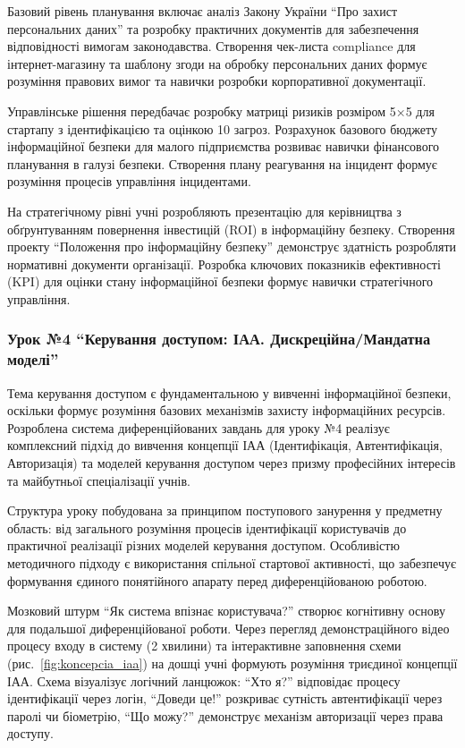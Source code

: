 Базовий рівень планування включає аналіз Закону України ``Про захист персональних даних'' та розробку практичних документів для забезпечення відповідності вимогам законодавства. Створення чек-листа compliance для інтернет-магазину та шаблону згоди на обробку персональних даних формує розуміння правових вимог та навички розробки корпоративної документації.

Управлінське рішення передбачає розробку матриці ризиків розміром 5×5 для стартапу з ідентифікацією та оцінкою 10 загроз. Розрахунок базового бюджету інформаційної безпеки для малого підприємства розвиває навички фінансового планування в галузі безпеки. Створення плану реагування на інцидент формує розуміння процесів управління інцидентами.

На стратегічному рівні учні розробляють презентацію для керівництва з обґрунтуванням повернення інвестицій (ROI) в інформаційну безпеку. Створення проекту ``Положення про інформаційну безпеку'' демонструє здатність розробляти нормативні документи організації. Розробка ключових показників ефективності (KPI) для оцінки стану інформаційної безпеки формує навички стратегічного управління.

\subsubsection{Урок №4 ``Керування доступом: ІАА. Дискреційна/Мандатна моделі''}

Тема керування доступом є фундаментальною у вивченні інформаційної безпеки, оскільки формує розуміння базових механізмів захисту інформаційних ресурсів. Розроблена система диференційованих завдань для уроку №4 реалізує комплексний підхід до вивчення концепції ІАА (Ідентифікація, Автентифікація, Авторизація) та моделей керування доступом через призму професійних інтересів та майбутньої спеціалізації учнів.

Структура уроку побудована за принципом поступового занурення у предметну область: від загального розуміння процесів ідентифікації користувачів до практичної реалізації різних моделей керування доступом. Особливістю методичного підходу є використання спільної стартової активності, що забезпечує формування єдиного понятійного апарату перед диференційованою роботою.

Мозковий штурм ``Як система впізнає користувача?'' створює когнітивну основу для подальшої диференційованої роботи. Через перегляд демонстраційного відео процесу входу в систему (2 хвилини) та інтерактивне заповнення схеми (рис.~\ref{fig:koncepcia_iaa}) на дошці учні формують розуміння триєдиної концепції ІАА. Схема візуалізує логічний ланцюжок: ``Хто я?'' відповідає процесу ідентифікації через логін, ``Доведи це!'' розкриває сутність автентифікації через паролі чи біометрію, ``Що можу?'' демонструє механізм авторизації через права доступу.

